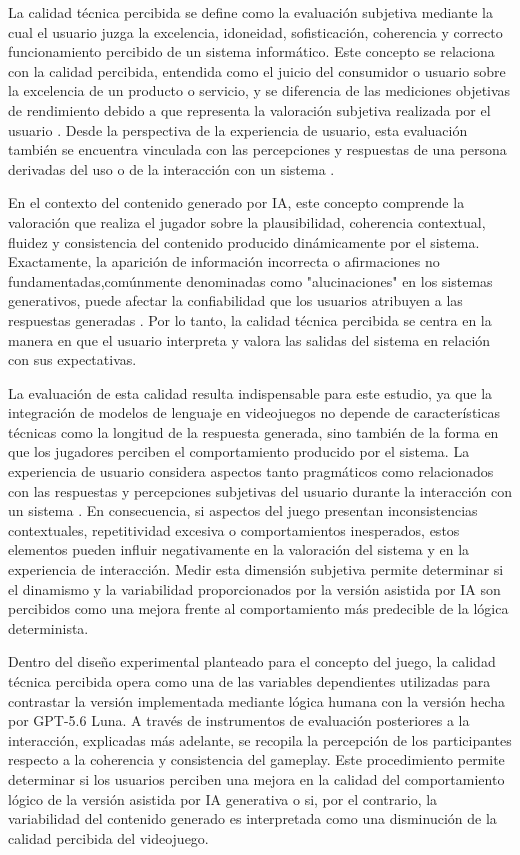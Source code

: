 La calidad técnica percibida se define como la evaluación subjetiva mediante la cual el usuario juzga la excelencia, idoneidad, sofisticación, coherencia y correcto funcionamiento percibido de un sistema informático. Este concepto se relaciona con la calidad percibida, entendida como el juicio del consumidor o usuario sobre la excelencia de un producto o servicio, y se diferencia de las mediciones objetivas de rendimiento debido a que representa la valoración subjetiva realizada por el usuario \cite{zeithaml1988consumer}. Desde la perspectiva de la experiencia de usuario, esta evaluación también se encuentra vinculada con las percepciones y respuestas de una persona derivadas del uso o de la interacción con un sistema \cite{iso9241_210_2019}.

En el contexto del contenido generado por IA, este concepto comprende la valoración que realiza el jugador sobre la plausibilidad, coherencia contextual, fluidez y consistencia del contenido producido dinámicamente por el sistema. Exactamente, la aparición de información incorrecta o afirmaciones no fundamentadas,comúnmente denominadas como "alucinaciones" en los sistemas generativos, puede afectar la confiabilidad que los usuarios atribuyen a las respuestas generadas \cite{ji2023survey}. Por lo tanto, la calidad técnica percibida se centra en la manera en que el usuario interpreta y valora las salidas del sistema en relación con sus expectativas.

La evaluación de esta calidad resulta indispensable para este estudio, ya que la integración de modelos de lenguaje en videojuegos no depende de características técnicas como la longitud de la respuesta generada, sino también de la forma en que los jugadores perciben el comportamiento producido por el sistema. La experiencia de usuario considera aspectos tanto pragmáticos como relacionados con las respuestas y percepciones subjetivas del usuario durante la interacción con un sistema \cite{iso9241_210_2019}. En consecuencia, si aspectos del juego presentan inconsistencias contextuales, repetitividad excesiva o comportamientos inesperados, estos elementos pueden influir negativamente en la valoración del sistema y en la experiencia de interacción. Medir esta dimensión subjetiva permite determinar si el dinamismo y la variabilidad proporcionados por la versión asistida por IA son percibidos como una mejora frente al comportamiento más predecible de la lógica determinista.

Dentro del diseño experimental planteado para el concepto del juego, la calidad técnica percibida opera como una de las variables dependientes utilizadas para contrastar la versión implementada mediante lógica humana con la versión hecha por GPT-5.6 Luna. A través de instrumentos de evaluación posteriores a la interacción, explicadas más adelante, se recopila la percepción de los participantes respecto a la coherencia y consistencia del gameplay. Este procedimiento permite determinar si los usuarios perciben una mejora en la calidad del comportamiento lógico de la versión asistida por IA generativa o si, por el contrario, la variabilidad del contenido generado es interpretada como una disminución de la calidad percibida del videojuego. 


